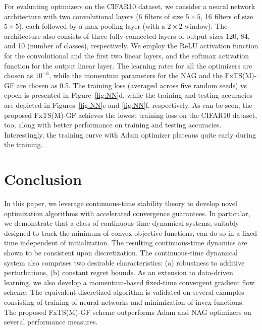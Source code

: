 \documentclass[letterpaper]{article}
\begin{document}
For evaluating optimizers on the CIFAR10 dataset, we consider a neural network architecture with two convolutional layers (6 filters of size $5\times5$, 16 filters of size $5\times5$), each followed by a max-pooling layer (with a $2\times 2$ window). The architecture also consists of three fully connected layers of output sizes 120, 84, and 10 (number of classes), respectively. We employ the ReLU activation function for the convolutional and the first two linear layers, and the softmax activation function for the output linear layer. The learning rates for all the optimizers are chosen as $10^{-3}$, while the momentum parameters for the NAG and the FxTS(M)-GF are chosen as 0.5. The training loss (averaged across five random seeds) vs epoch is presented in Figure~\ref{fig:NN}d, while the training and testing accuracies are depicted in Figures~\ref{fig:NN}e and \ref{fig:NN}f, respectively. As can be seen, the proposed FxTS(M)-GF achieves the lowest training loss on the CIFAR10 dataset, too, along with better performance on training and testing accuracies. Interestingly, the training curve with Adam optimizer plateaus quite early during the training.\vspace{-1em}

\section{Conclusion} \label{sec: conclusion}
In this paper, we leverage continuous-time stability theory to develop novel optimization algorithms with accelerated convergence guarantees. In particular, we demonstrate that a class of continuous-time dynamical systems, suitably designed to track the minimum of convex objective functions, can do so in a fixed time independent of initialization. The resulting continuous-time dynamics are shown to be consistent upon discretization. The continuous-time dynamical system also comprises two desirable characteristics: (a) robustness to additive perturbations, (b) constant regret bounds. As an extension to data-driven learning, we also develop a momentum-based fixed-time convergent gradient flow scheme. The equivalent discretized algorithm is validated on several examples consisting of training of neural networks and minimization of invex functions. The proposed FxTS(M)-GF scheme outperforms Adam and NAG optimizers on several performance measures.

\pagebreak


\end{document}

